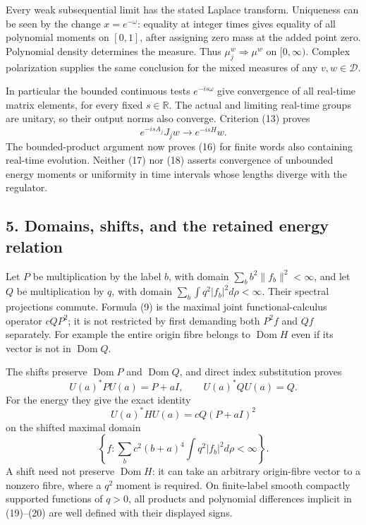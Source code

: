 \documentclass[
  11pt,
]{article}
\begin{document}
Every weak subsequential limit has the stated Laplace transform.
Uniqueness can be seen by the change \(x=e^{-\omega}\): equality at
integer times gives equality of all polynomial moments on \([0,1]\),
after assigning zero mass at the added point zero. Polynomial density
determines the measure. Thus \(\mu_j^w\Rightarrow\mu^w\) on
\([0,\infty)\). Complex polarization supplies the same conclusion for
the mixed measures of any \(v,w\in\mathcal D\).

In particular the bounded continuous tests \(e^{-is\omega}\) give
convergence of all real-time matrix elements, for every fixed
\(s\in\mathbb R\). The actual and limiting real-time groups are unitary,
so their output norms also converge. Criterion (13) proves \[
 e^{-isA_j}J_jw\longrightarrow e^{-isH}w .
 \tag{18}
\] The bounded-product argument now proves (16) for finite words also
containing real-time evolution. Neither (17) nor (18) asserts
convergence of unbounded energy moments or uniformity in time intervals
whose lengths diverge with the regulator.

\subsection{5. Domains, shifts, and the retained energy
relation}\label{weak-coupling-part-7-domains-shifts-and-the-retained-energy-relation}

Let \(P\) be multiplication by the label \(b\), with domain
\(\sum_b b^2\|f_b\|^2<\infty\), and let \(Q\) be multiplication by
\(q\), with domain \(\sum_b\int q^2|f_b|^2d\rho<\infty\). Their spectral
projections commute. Formula (9) is the maximal joint
functional-calculus operator \(cQP^2\); it is not restricted by first
demanding both \(P^2f\) and \(Qf\) separately. For example the entire
origin fibre belongs to \(\operatorname{Dom}H\) even if its vector is
not in \(\operatorname{Dom}Q\).

The shifts preserve \(\operatorname{Dom}P\) and \(\operatorname{Dom}Q\),
and direct index substitution proves \[
 U(a)^*PU(a)=P+aI,\qquad U(a)^*QU(a)=Q .
 \tag{19}
\] For the energy they give the exact identity \[
 U(a)^*HU(a)=cQ(P+aI)^2
 \tag{20}
\] on the shifted maximal domain \[
 \left\{f:\sum_b c^2(b+a)^4\int q^2|f_b|^2d\rho<\infty\right\}.
\] A shift need not preserve \(\operatorname{Dom}H\): it can take an
arbitrary origin-fibre vector to a nonzero fibre, where a \(q^2\) moment
is required. On finite-label smooth compactly supported functions of
\(q>0\), all products and polynomial differences implicit in (19)--(20)
are well defined with their displayed signs.
\end{document}
